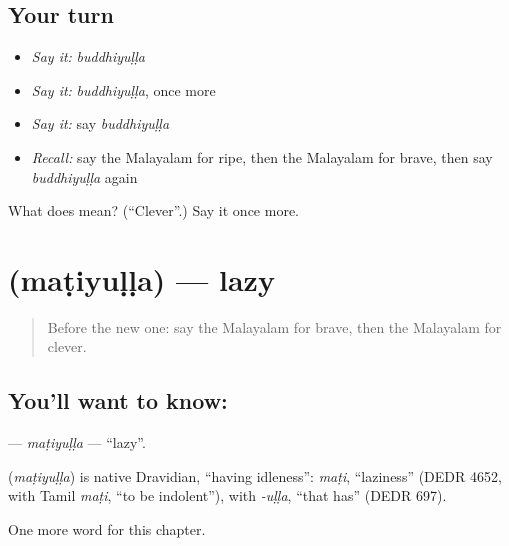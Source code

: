 \subsection*{Your turn}
\begin{itemize}
\raggedright
  \item \emph{Say it:} \emph{buddhiyuḷḷa}
  \item \emph{Say it:} \emph{buddhiyuḷḷa}, once more
  \item \emph{Say it:} say \emph{buddhiyuḷḷa}
  \item \emph{Recall:} say the Malayalam for ripe, then the Malayalam for brave, then say \emph{buddhiyuḷḷa} again
\end{itemize}

\begin{tcolorbox}[breakable,colback=teal!4,colframe=teal!35!black,title={Before you move on}]
What does  mean? (\textquotedblleft{}Clever\textquotedblright{}.) Say it once more.
\end{tcolorbox}
\section[\texorpdfstring{\ml{മടിയുള്ള} (maṭiyuḷḷa)}{മടിയുള്ള (maṭiyuḷḷa)}]{ (maṭiyuḷḷa) — lazy}

\label{lesson:ML-C169-matiyulla}



\begin{quote}
Before the new one: say the Malayalam for brave, then the Malayalam for clever.
\end{quote}

\subsection*{You'll want to know: }
\textbf{} — \emph{maṭiyuḷḷa} — \textquotedblleft{}lazy\textquotedblright{}.

\begin{cousinweb}
\textbf{} (\emph{maṭiyuḷḷa}) is native Dravidian, \textquotedblleft{}having idleness\textquotedblright{}: \emph{maṭi}, \textquotedblleft{}laziness\textquotedblright{} (DEDR 4652, with Tamil \emph{maṭi}, \textquotedblleft{}to be indolent\textquotedblright{}), with \emph{-uḷḷa}, \textquotedblleft{}that has\textquotedblright{} (DEDR 697).
\end{cousinweb}

\begin{grammarlens}[title={What you've built}]
One more word for this chapter.
\end{grammarlens}


